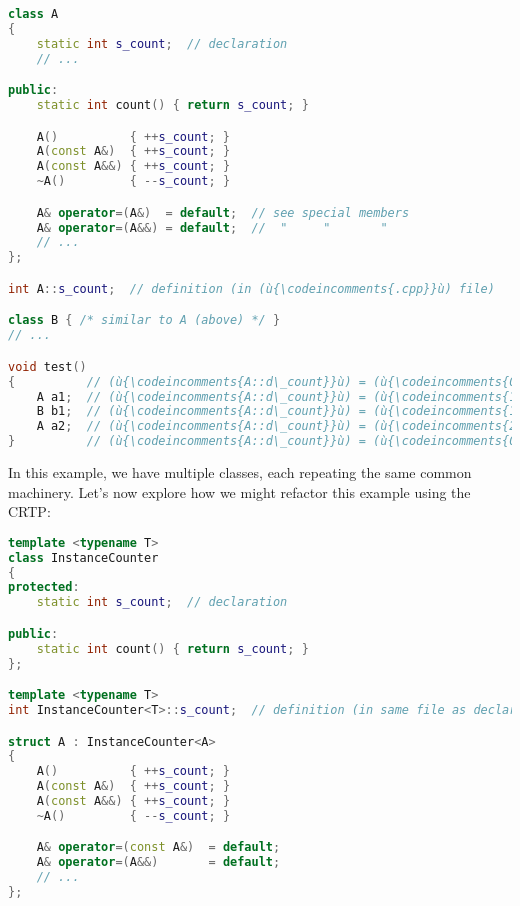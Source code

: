 \begin{lstlisting}[language=C++]
class A
{
    static int s_count;  // declaration
    // ...

public:
    static int count() { return s_count; }

    A()          { ++s_count; }
    A(const A&)  { ++s_count; }
    A(const A&&) { ++s_count; }
    ~A()         { --s_count; }

    A& operator=(A&)  = default;  // see special members
    A& operator=(A&&) = default;  //  "     "       "
    // ...
};

int A::s_count;  // definition (in (ù{\codeincomments{.cpp}}ù) file)

class B { /* similar to A (above) */ }
// ...

void test()
{          // (ù{\codeincomments{A::d\_count}}ù) = (ù{\codeincomments{0}}ù), (ù{\codeincomments{B::d\_count}}ù) = (ù{\codeincomments{0}}ù)
    A a1;  // (ù{\codeincomments{A::d\_count}}ù) = (ù{\codeincomments{1}}ù), (ù{\codeincomments{B::d\_count}}ù) = (ù{\codeincomments{0}}ù)
    B b1;  // (ù{\codeincomments{A::d\_count}}ù) = (ù{\codeincomments{1}}ù), (ù{\codeincomments{B::d\_count}}ù) = (ù{\codeincomments{1}}ù)
    A a2;  // (ù{\codeincomments{A::d\_count}}ù) = (ù{\codeincomments{2}}ù), (ù{\codeincomments{B::d\_count}}ù) = (ù{\codeincomments{1}}ù)
}          // (ù{\codeincomments{A::d\_count}}ù) = (ù{\codeincomments{0}}ù), (ù{\codeincomments{B::d\_count}}ù) = (ù{\codeincomments{0}}ù)
\end{lstlisting}

\noindent In this example, we have multiple classes, each repeating the same
common machinery. Let's now explore how we might refactor this example
using the CRTP:

\begin{lstlisting}[language=C++]
template <typename T>
class InstanceCounter
{
protected:
    static int s_count;  // declaration

public:
    static int count() { return s_count; }
};

template <typename T>
int InstanceCounter<T>::s_count;  // definition (in same file as declaration)

struct A : InstanceCounter<A>
{
    A()          { ++s_count; }
    A(const A&)  { ++s_count; }
    A(const A&&) { ++s_count; }
    ~A()         { --s_count; }

    A& operator=(const A&)  = default;
    A& operator=(A&&)       = default;
    // ...
};
\end{lstlisting}

